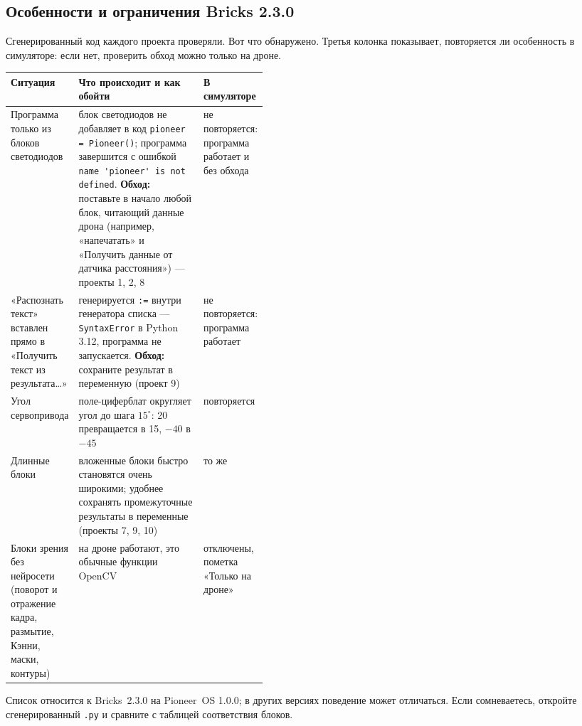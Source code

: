 \subsection{Особенности и ограничения Bricks 2.3.0}\label{sec:bricks-limits}

Сгенерированный код каждого проекта проверяли. Вот что обнаружено. Третья колонка показывает, повторяется ли особенность в симуляторе: если нет, проверить обход можно только на дроне.

\begin{center}\small
\begin{tabularx}{\linewidth}{@{}>{\raggedright\arraybackslash}p{0.22\linewidth}X>{\raggedright\arraybackslash}p{0.2\linewidth}@{}}
\toprule
\textbf{Ситуация} & \textbf{Что происходит и как обойти} & \textbf{В симуляторе} \\
\midrule
Программа только из блоков светодиодов &
  блок светодиодов не добавляет в код \verb|pioneer = Pioneer()|; программа завершится с ошибкой \verb|name 'pioneer' is not defined|. \textbf{Обход:} поставьте в начало любой блок, читающий данные дрона (например, «напечатать» и «Получить данные от датчика расстояния») --- проекты 1, 2, 8 &
  не повторяется: программа работает и без обхода \\
«Распознать текст» вставлен прямо в «Получить текст из результата…» &
  генерируется \verb|:=| внутри генератора списка --- \verb|SyntaxError| в Python 3.12, программа не запускается. \textbf{Обход:} сохраните результат в переменную (проект 9) &
  не повторяется: программа работает \\
Угол сервопривода &
  поле-циферблат округляет угол до шага $15^\circ$: 20 превращается в 15, $-40$ в $-45$ &
  повторяется \\
Длинные блоки &
  вложенные блоки быстро становятся очень широкими; удобнее сохранять промежуточные результаты в переменные (проекты 7, 9, 10) &
  то же \\
Блоки зрения без нейросети (поворот и отражение кадра, размытие, Кэнни, маски, контуры) &
  на дроне работают, это обычные функции OpenCV &
  отключены, пометка «Только на дроне» \\
\bottomrule
\end{tabularx}
\end{center}

\begin{infobox}[Версия 2.3.0]
Список относится к Bricks~2.3.0 на Pioneer~OS 1.0.0; в других версиях поведение может отличаться. Если сомневаетесь, откройте сгенерированный \texttt{.py} и сравните с таблицей соответствия блоков.
\end{infobox}

